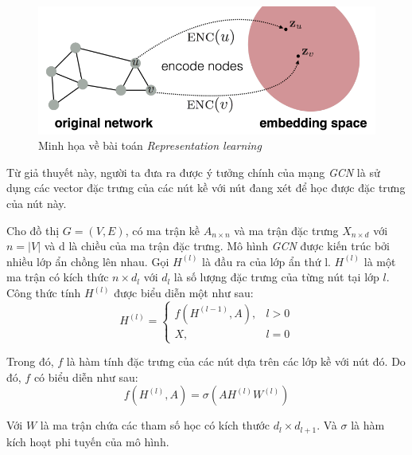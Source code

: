 \begin{figure}[H]
    \begin{center}
        \includegraphics[scale=0.5]{images/representation-learning}
        \caption{Minh họa về bài toán \textit{Representation learning}}
        \label{fig:representation-learning}
    \end{center}
\end{figure}


Từ giả thuyết này, người ta đưa ra được ý tưởng chính của mạng \textit{GCN} là sử dụng các vector đặc trưng của các nút kề với nút đang xét để học được đặc trưng của nút này.

Cho đồ thị $G = (V,E)$, có ma trận kề $A_{n \times n}$ và ma trận đặc trưng $X_{n \times d}$ với $n = |V|$ và d là chiều của ma trận đặc trưng. Mô hình \textit{GCN} được kiến trúc bởi nhiều lớp ẩn chồng lên nhau. Gọi $H^{(l)}$ là đầu ra của lớp ẩn thứ l. $H^{(l)}$ là một ma trận có kích thức $n \times d_l$ với $d_l$ là số lượng đặc trưng của từng nút tại lớp $l$. Công thức tính $H^{(l)}$ được biểu diễn một như sau:
\begin{equation*}
	H^{(l)} = 
	\begin{cases}
		f(H^{(l-1)}, A), & l > 0 \\
		X, & l = 0		
	\end{cases}
\end{equation*}

Trong đó, $f$ là hàm tính đặc trưng của các nút dựa trên các lớp kề với nút đó. Do đó, $f$ có biểu diễn như sau:
\begin{equation*}
	f(H^{(l)}, A) = \sigma(AH^{(l)}W^{(l)})
\end{equation*}

Với $W$ là ma trận chứa các tham số học có kích thước $d_l \times d_{l+1}$. Và $\sigma$ là hàm kích hoạt phi tuyến của mô hình. 

